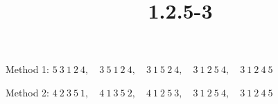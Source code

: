 \documentclass{article}
\title{1.2.5-3}
\begin{document}
\maketitle

Method 1: \( 5\ 3\ 1\ 2\ 4,\quad 3\ 5\ 1\ 2\ 4,\quad 3\ 1\ 5\ 2\ 4,\quad 3\ 1\ 2\ 5\ 4,\quad 3\ 1\ 2\ 4\ 5 \)

Method 2: \( 4\ 2\ 3\ 5\ 1,\quad 4\ 1\ 3\ 5\ 2,\quad 4\ 1\ 2\ 5\ 3,\quad 3\ 1\ 2\ 5\ 4,\quad 3\ 1\ 2\ 4\ 5 \)
\end{document}
